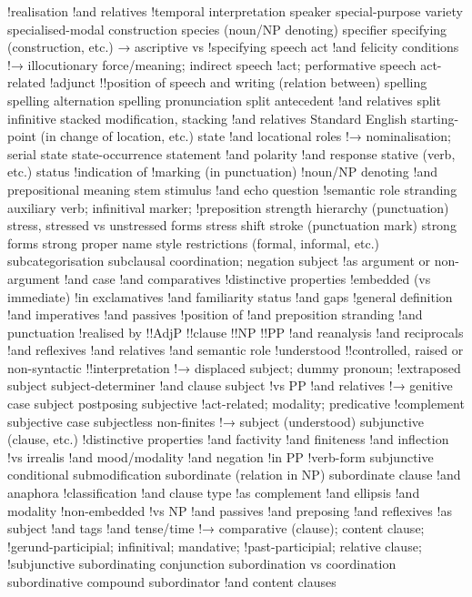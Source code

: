 !realisation
!and relatives
!temporal interpretation
speaker
special-purpose variety
specialised-modal construction
species (noun/NP denoting)
specifier
specifying (construction, etc.) → ascriptive vs
!specifying
speech act
!and felicity conditions
!→ illocutionary force/meaning; indirect speech
!act; performative
speech act-related
!adjunct
!!position of
speech and writing (relation between)
spelling
spelling alternation
spelling pronunciation
split antecedent
!and relatives
split infinitive
stacked modification, stacking
!and relatives
Standard English
starting-point (in change of location, etc.)
state
!and locational roles
!→ nominalisation; serial state
state-occurrence
statement
!and polarity
!and response
stative (verb, etc.)
status
!indication of
!marking (in punctuation)
!noun/NP denoting
!and prepositional meaning
stem
stimulus
!and echo question
!semantic role
stranding auxiliary verb; infinitival marker;
!preposition
strength hierarchy (punctuation)
stress, stressed vs unstressed forms
stress shift
stroke (punctuation mark)
strong forms
strong proper name
style restrictions (formal, informal, etc.)
subcategorisation
subclausal coordination; negation
subject
!as argument or non-argument
!and case
!and comparatives
!distinctive properties
!embedded (vs immediate)
!in exclamatives
!and familiarity status
!and gaps
!general definition
!and imperatives
!and passives
!position of
!and preposition stranding
!and punctuation
!realised by
!!AdjP
!!clause
!!NP
!!PP
!and reanalysis
!and reciprocals
!and reflexives
!and relatives
!and semantic role
!understood
!!controlled, raised or non-syntactic
!!interpretation
!→ displaced subject; dummy pronoun;
!extraposed subject
subject-determiner
!and clause subject
!vs PP
!and relatives
!→ genitive case
subject postposing
subjective
!act-related; modality; predicative
!complement
subjective case
subjectless non-finites
!→ subject (understood)
subjunctive (clause, etc.)
!distinctive properties
!and factivity
!and finiteness
!and inflection
!vs irrealis
!and mood/modality
!and negation
!in PP
!verb-form
subjunctive conditional
submodification
subordinate (relation in NP)
subordinate clause
!and anaphora
!classification
!and clause type
!as complement
!and ellipsis
!and modality
!non-embedded
!vs NP
!and passives
!and preposing
!and reflexives
!as subject
!and tags
!and tense/time
!→ comparative (clause); content clause;
!gerund-participial; infinitival; mandative;
!past-participial; relative clause;
!subjunctive
subordinating conjunction
subordination vs coordination
subordinative compound
subordinator
!and content clauses
